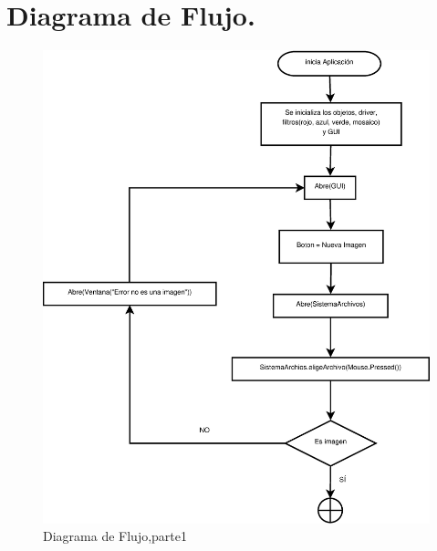 \documentclass{article}
\begin{document}
\section{Diagrama de Flujo.}
\begin{figure}[h]
    \includegraphics[scale=.36]{images/Diagrama1.eps} 
    \caption{Diagrama de Flujo,parte1}
\end{figure}
\end{document}
